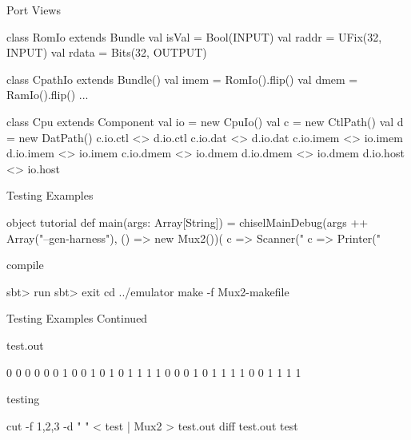 \documentclass[xcolor=pdflatex,dvipsnames,table]{beamer}
\begin{document}
\begin{frame}[fragile]{Port Views}

{
\begin{scala}
class RomIo extends Bundle {
  val isVal = Bool(INPUT)
  val raddr = UFix(32, INPUT)
  val rdata = Bits(32, OUTPUT)
}

class CpathIo extends Bundle() {
  val imem = RomIo().flip()
  val dmem = RamIo().flip()
  ...
}

class Cpu extends Component {
  val io = new CpuIo()
  val c  = new CtlPath()
  val d  = new DatPath()
  c.io.ctl  <> d.io.ctl
  c.io.dat  <> d.io.dat
  c.io.imem <> io.imem
  d.io.imem <> io.imem
  c.io.dmem <> io.dmem
  d.io.dmem <> io.dmem
  d.io.host <> io.host
}
\end{scala}
}

\end{frame}

\begin{frame}{Testing Examples}

\begin{scala}
object tutorial {
  def main(args: Array[String]) = {
    chiselMainDebug(args ++ Array("--gen-harness"), 
                   () => new Mux2())(
      c => Scanner("%
      c => Printer("%
  }
}
\end{scala}

compile

\begin{scala}
sbt> run
sbt> exit
cd ../emulator
make -f Mux2-makefile
\end{scala}

\end{frame}

\begin{frame}{Testing Examples Continued}

test.out

\begin{scala}
0 0 0 0
0 0 1 0
0 1 0 1
0 1 1 1
1 0 0 0
1 0 1 1
1 1 0 0
1 1 1 1
\end{scala}

testing

\begin{scala}
cut -f 1,2,3 -d " " < test | Mux2 > test.out
diff test.out test
\end{scala}

\end{frame}
\end{document}
